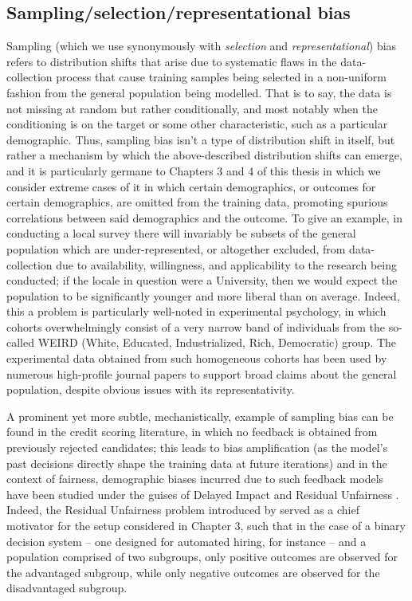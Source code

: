 \subsection{Sampling/selection/representational bias}\label{ssec:sampling-bias}
Sampling (which we use synonymously with \emph{selection} and \emph{representational}) bias refers
to distribution shifts that arise due to systematic flaws in the data-collection process that cause
training samples being selected in a non-uniform fashion from the general population being
modelled.
%
That is to say, the data is not missing at random but rather conditionally, and most notably when
the conditioning is on the target or some other characteristic, such as a particular demographic.
%
Thus, sampling bias isn't a type of distribution shift in itself, but rather a mechanism by which the
above-described distribution shifts can emerge, and it is particularly germane to Chapters 3 and 4
of this thesis in which we consider extreme cases of it in which certain demographics, or outcomes
for certain demographics, are omitted from the training data, promoting spurious correlations
between said demographics and the outcome.
%
To give an example, in conducting a local survey there will invariably be subsets of the general
population which are under-represented, or altogether excluded, from data-collection due to
availability, willingness, and applicability to the research being conducted; if the locale in
question were a University, then we would expect the population to be significantly younger and
more liberal than on average.
%
Indeed, this a problem is particularly well-noted in experimental psychology, in which cohorts
overwhelmingly consist of a very narrow band of individuals from the so-called WEIRD (White,
Educated, Industrialized, Rich, Democratic)\citep{henrich2010weirdest} group.
%
The experimental data obtained from such homogeneous cohorts has been used by numerous high-profile
journal papers to support broad claims about the general population, despite obvious issues with
its representativity.

%
A prominent yet more subtle, mechanistically, example of sampling bias can be found in the credit
scoring literature, in which no feedback is obtained from previously rejected candidates; this
leads to bias amplification (as the model's past decisions directly shape the training data at
future iterations) and in the context of fairness, demographic biases incurred due to such feedback
models have been studied under the guises of Delayed Impact \citep{liu2018delayed} and Residual
Unfairness \citep{kallus2018residual}.
%
Indeed, the Residual Unfairness problem introduced by \cite{kallus2018residual} served as a chief
motivator for the setup considered in Chapter 3, such that in the case of a binary decision system
-- one designed for automated hiring, for instance -- and a population comprised of two subgroups,
only positive outcomes are observed for the advantaged subgroup, while only negative outcomes are
observed for the disadvantaged subgroup.

